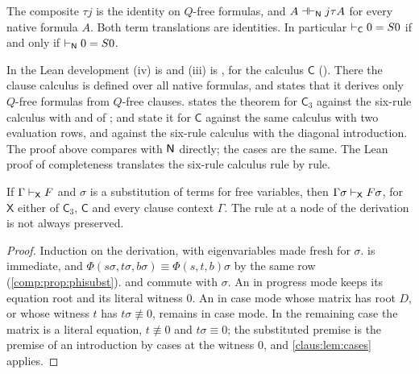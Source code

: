 \begin{corollary}
\label{claus:cor:composites}
The composite $\tau j$ is the identity on $Q$-free formulas, and
$A\dashv\vdash_{\mathsf{N}}j\tau A$ for every native formula $A$. Both term
translations are identities. In particular
$\vdash_{\mathsf{C}}0=S 0$ if and only if $\vdash_{\mathsf{N}}0=S 0$.
\end{corollary}

\begin{remark}
\label{claus:rem:fivepkgs}
In the Lean development (iv) is  and (iii) is
, for the calculus $\mathsf{C}$
(). There the clause calculus is defined over all
native formulas, and  states that it derives only
$Q$-free formulas from $Q$-free clauses.  states the
theorem for $\mathsf{C}_3$ against the six-rule calculus with
 and  of ;
 and  state it for
$\mathsf{C}$ against the same calculus with two evaluation rows, and
 against the six-rule calculus with the diagonal
introduction. The proof above compares with $\mathsf{N}$ directly; the cases are
the same. The Lean proof of completeness translates the six-rule calculus
rule by rule.
\end{remark}

\begin{proposition}[Substitution]
\label{claus:prop:subst}
If $\Gamma\vdash_{\mathsf{X}}F$ and $\sigma$ is a substitution of terms for
free variables, then $\Gamma\sigma\vdash_{\mathsf{X}}F\sigma$, for
$\mathsf{X}$ either of $\mathsf{C}_3$, $\mathsf{C}$ and every clause context
$\Gamma$. The rule at a node of the derivation is not always preserved.
\end{proposition}
\begin{proof}
Induction on the derivation, with eigenvariables made fresh for $\sigma$.
 is immediate, and
$\Phi(s\sigma,t\sigma,b\sigma)\equiv\Phi(s,t,b)\sigma$ by the same row
(\cref{comp:prop:phisubst}).  and  commute
with $\sigma$. An
 in progress mode keeps its equation root and its literal
witness $0$. An  in case mode whose matrix has root $D$, or
whose witness $t$ has $t\sigma\not\equiv 0$, remains in case mode. In the
remaining case the matrix is a literal equation, $t\not\equiv 0$ and
$t\sigma\equiv 0$; the substituted premise is the premise of an
introduction by cases at the witness $0$, and \cref{claus:lem:cases}
applies.
\end{proof}

